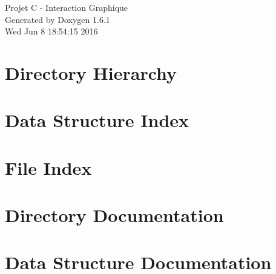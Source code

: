 \documentclass[a4paper]{book}
\begin{document}
\hypersetup{pageanchor=false}
\begin{titlepage}
\vspace*{7cm}
\begin{center}
{\Large Projet C -\/ Interaction Graphique }\\
\vspace*{1cm}
{\large Generated by Doxygen 1.6.1}\\
\vspace*{0.5cm}
{\small Wed Jun 8 18:54:15 2016}\\
\end{center}
\end{titlepage}
\clearemptydoublepage
{}
\tableofcontents
\clearemptydoublepage
{}
\hypersetup{pageanchor=true}
\chapter{Directory Hierarchy}

\chapter{Data Structure Index}

\chapter{File Index}

\chapter{Directory Documentation}


\chapter{Data Structure Documentation}





























\end{document}
